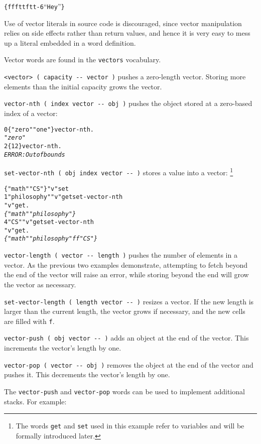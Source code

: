 \documentclass[english]{article}
\begin{document}
{\begin{alltt}
\{ f f f t t f t t -6 {}``Hey'' \}
\end{alltt}
Use of vector literals in source code is discouraged, since vector
manipulation relies on side effects rather than return values, and
hence it is very easy to mess up a literal embedded in a word definition.

Vector words are found in the \texttt{vectors} vocabulary.

\texttt{<vector> ( capacity -{}- vector )} pushes a zero-length vector.
Storing more elements than the initial capacity grows the vector.

\texttt{vector-nth ( index vector -{}- obj )} pushes the object stored
at a zero-based index of a vector:

\begin{alltt}
0 \{ "zero" "one" \} vector-nth .
\emph{"zero"}
2 \{ 1 2 \} vector-nth .
\emph{ERROR: Out of bounds}
\end{alltt}

\texttt{set-vector-nth ( obj index vector -{}- )} stores a value into
a vector:%
\footnote{The words \texttt{get} and \texttt{set} used in this example refer to variables and will
be formally introduced later.%
}

\begin{alltt}
\{ "math" "CS" \} "v" set
1 "philosophy" "v" get set-vector-nth
"v" get .
\emph{\{ "math" "philosophy" \}}
4 "CS" "v" get set-vector-nth
"v" get .
\emph{\{ "math" "philosophy" f f "CS" \}}
\end{alltt}

\texttt{vector-length ( vector -{}- length )} pushes the number of
elements in a vector. As the previous two examples demonstrate, attempting
to fetch beyond the end of the vector will raise an error, while storing
beyond the end will grow the vector as necessary.

\texttt{set-vector-length ( length vector -{}- )} resizes a vector.
If the new length is larger than the current length, the vector grows
if necessary, and the new cells are filled with \texttt{f}.

\texttt{vector-push ( obj vector -{}- )} adds an object at the end
of the vector. This increments the vector's length by one.

\texttt{vector-pop ( vector -{}- obj )} removes the object at the
end of the vector and pushes it. This decrements the vector's length
by one.

The \texttt{vector-push} and \texttt{vector-pop} words can be used to implement additional stacks. For example:

}
\end{document}
